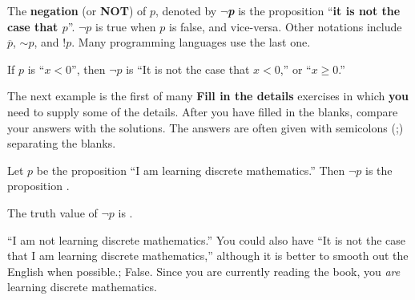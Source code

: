 \begin{df}
The {\bf negation} (or {\bf NOT}) of $p$, denoted by 
$\boldsymbol{\neg}${\bf\em p} 
is the proposition ``{\bf it is not the case that \boldmath$p$}''.  
$\neg p$ is true when $p$ is false, and vice-versa.
Other notations include $\overline{p}$, $\sim p$,
and $!p$. 
Many programming languages use the last one.
\end{df}

\begin{exa}
If $p$ is ``$x<0$'', then $\neg p$ is 
``It is not the case that $x<0$,'' or ``$x\geq 0$.''
\end{exa}

\begin{rem}
The next example is the first of many {\bf Fill in the details} exercises in 
which {\bf you} need to supply some of the details.   
After you have filled in the blanks, compare your answers with the solutions.  
The answers are often given with semicolons (;) separating the blanks.  
\end{rem}

\vspace*{-.1in} %

\begin{fib}
Let $p$ be the proposition ``I am learning discrete mathematics.''
Then $\neg p$ is the proposition \blanklinefill.

\noindent
The truth value of $\neg p$ is .
\begin{answer}
``I am not learning discrete mathematics.''  
You could also have ``It is not the case that I am learning discrete mathematics,''
although it is better to smooth out the English when possible.;
False.  Since you are currently reading the book, you {\em are} learning discrete mathematics.
\end{answer}
\end{fib}

